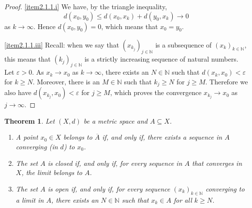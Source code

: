 \documentclass[a4paper,reqno]{amsart}
\numberwithin{equation}{section}
\newtheorem{theorem}[definition]{Theorem}
\def\N{\mathbb{N}}
\begin{document}
\begin{proof}
\eqref{item2.1.1.i} We have, by the triangle inequality,
\[
d(x_0,y_0) \le d(x_0,x_k) + d(y_0,x_k) \to 0
\]
as $k \to \infty$. Hence $d(x_0,y_0) = 0$, which means that $x_0 = y_0$.

\eqref{item2.1.1.iii} Recall: when we say that $(x_{k_j})_{j \in \N}$ is a subsequence of $(x_k)_{k \in \N}$,
this means that $(k_j)_{j\in \N}$ is a strictly increasing sequence of natural numbers. Let $\varepsilon > 0$.
As $x_k \to x_0$ as $k \to \infty$, there exists an $N \in \N$ such that $d(x_k,x_0) < \varepsilon$ for $k \ge N$.
Moreover, there is an $M \in \N$ such that $k_j \ge N$ for $j \ge M$. Therefore we also have $d(x_{k_j},x_0) < \varepsilon$
for $j \ge M$, which proves the convergence $x_{k_j} \to x_0$ as $j \to \infty$.
\end{proof}

\begin{theorem} \label{thm:limit_closed}
Let $(X,d)$ be a metric space and $A \subseteq X$.
\begin{enumerate}
\item \label{item2.1.2.i} A point $x_0 \in X$ belongs to $\overline{A}$ if,
and only if, there exists a sequence in $A$ converging (in $d$) to $x_0$.
\item \label{item2.1.2.ii} The set $A$ is closed if, and only if, for every sequence
in $A$ that converges in $X$, the limit belongs to $A$.
\item \label{item2.1.2.iii} The set $A$ is open if, and only if, for
every sequence $(x_k)_{k \in \N}$  converging to a limit in $A$,
there exists an $N \in \N$ such that $x_k \in A$ for all $k \ge N$.
\end{enumerate}
\end{theorem}
\end{document}
